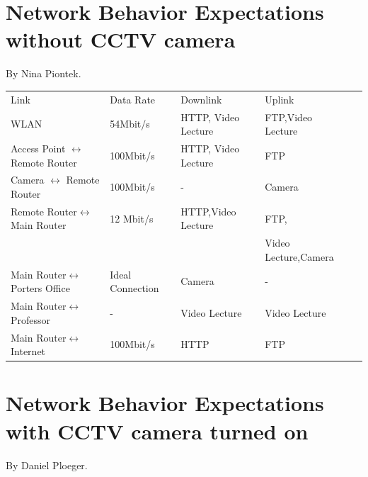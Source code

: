 \documentclass[a4paper,10pt]{book}\usepackage{graphicx}
\begin{document}
\section{Network Behavior  Expectations without CCTV camera}
By Nina Piontek.

\begin{minipage}[t]{0.5\textwidth}
\begin{tabular}{|l|l|l|l|l|}
\cline{1-4}
 Link & Data Rate  & Downlink  & Uplink  \\ \cline{1-4}
 WLAN & 54Mbit/s  & HTTP, Video Lecture & FTP,Video Lecture \\ \cline{1-4}
 Access Point $\leftrightarrow$ Remote Router & 100Mbit/s  &HTTP, Video Lecture& FTP  \\ \cline{1-4}
 Camera $\leftrightarrow$ Remote Router & 100Mbit/s  & - & Camera\\ \cline{1-4}
 Remote Router$\leftrightarrow$Main Router&12 Mbit/s&HTTP,Video Lecture& FTP, \\ 
 & & & Video Lecture,Camera \\ \cline{1-4}
 Main Router$\leftrightarrow $ Porters Office &Ideal Connection &Camera& - \\ \cline{1-4}
 Main Router$\leftrightarrow $ Professor & -  &Video Lecture&Video Lecture \\ \cline{1-4}
 Main Router$\leftrightarrow $ Internet &100Mbit/s &HTTP& FTP \\ \cline{1-4}
\end{tabular}
\end{minipage}
\section{Network Behavior  Expectations with CCTV camera turned on}
By Daniel Ploeger.
\end{document}
